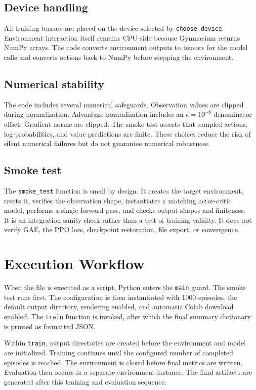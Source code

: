 \documentclass[11pt,a4paper]{article}
\begin{document}
\subsection{Device handling}
All training tensors are placed on the device selected by \texttt{choose\_device}. Environment interaction itself remains CPU-side because Gymnasium returns NumPy arrays. The code converts environment outputs to tensors for the model calls and converts actions back to NumPy before stepping the environment.

\subsection{Numerical stability}
The code includes several numerical safeguards. Observation values are clipped during normalization. Advantage normalization includes an $\epsilon=10^{-8}$ denominator offset. Gradient norms are clipped. The smoke test asserts that sampled actions, log-probabilities, and value predictions are finite. These choices reduce the risk of silent numerical failures but do not guarantee numerical robustness.

\subsection{Smoke test}
The \texttt{smoke\_test} function is small by design. It creates the target environment, resets it, verifies the observation shape, instantiates a matching actor-critic model, performs a single forward pass, and checks output shapes and finiteness. It is an integration sanity check rather than a test of training validity. It does not verify GAE, the PPO loss, checkpoint restoration, file export, or convergence.

\section{Execution Workflow}
When the file is executed as a script, Python enters the \texttt{main} guard. The smoke test runs first. The configuration is then instantiated with 1000 episodes, the default output directory, rendering enabled, and automatic Colab download enabled. The \texttt{train} function is invoked, after which the final summary dictionary is printed as formatted JSON.

Within \texttt{train}, output directories are created before the environment and model are initialized. Training continues until the configured number of completed episodes is reached. The environment is closed before final metrics are written. Evaluation then occurs in a separate environment instance. The final artifacts are generated after this training and evaluation sequence.
\end{document}
